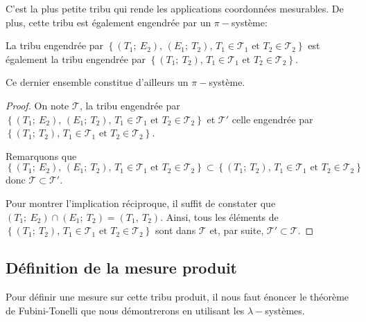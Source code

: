 C'est la plus petite tribu qui rende les applications \og coordonnées \fg{} mesurables. De plus, cette tribu est également engendrée par un $\pi-$système:

\begin{prop}
La tribu engendrée par $\left \{ \left(T_1;~E_2\right), \, \left(E_1;~T_2\right), \, T_1 \in \mathcal{T}_1 \text{ et }T_2 \in \mathcal{T}_2\right \}$ est également la tribu engendrée par $\left \{ \left(T_1;~T_2\right), \, T_1 \in \mathcal{T}_1 \text{ et }T_2 \in \mathcal{T}_2\right \}$.
\end{prop}

Ce dernier ensemble constitue d'ailleurs un $\pi-$système.

\begin{proof}
On note $\mathcal{T}$, la tribu engendrée par $\left \{ \left(T_1;~E_2\right), \, \left(E_1;~T_2\right), \, T_1 \in \mathcal{T}_1 \text{ et }T_2 \in \mathcal{T}_2\right \}$ et $\mathcal{T}'$ celle engendrée par $\left \{ \left(T_1;~T_2\right), \, T_1 \in \mathcal{T}_1 \text{ et }T_2 \in \mathcal{T}_2\right \}$.

Remarquons que $\left \{ \left(T_1;~E_2\right), \, \left(E_1;~T_2\right), \, T_1 \in \mathcal{T}_1 \text{ et }T_2 \in \mathcal{T}_2\right \} \subset \left \{ \left(T_1;~T_2\right), \, T_1 \in \mathcal{T}_1 \text{ et }T_2 \in \mathcal{T}_2\right \}$ donc $\mathcal{T} \subset \mathcal{T}'$.

Pour montrer l'implication réciproque, il suffit de constater que $\left(T_1;~E_2\right) \cap \left(E_1;~T_2\right) = \left(T_1,~T_2\right)$. Ainsi, tous les éléments de $\left \{ \left(T_1;~T_2\right), \, T_1 \in \mathcal{T}_1 \text{ et }T_2 \in \mathcal{T}_2\right \}$ sont dans $\mathcal{T}$ et, par suite, $\mathcal{T}' \subset \mathcal{T}$.
\end{proof}

\subsection{Définition de la mesure produit}

Pour définir une mesure sur cette tribu produit, il nous faut énoncer le théorème de Fubini-Tonelli que nous démontrerons en utilisant les $\lambda-$systèmes.

